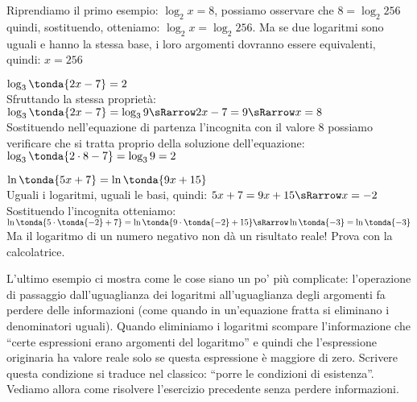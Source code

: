 \begin{esempio}
 Riprendiamo il primo esempio: \(\log_2{x} = 8\), possiamo osservare che 
 \(8 = \log_2{256}\) quindi, sostituendo, 
 otteniamo: \(\log_2{x} = \log_2{256}\). Ma se due logaritmi sono uguali e 
hanno la stessa base, i loro argomenti dovranno essere equivalenti, quindi:
\(x = 256\)
\end{esempio}

\begin{esempio}
 \(\log_{3}\tonda{2x-7} = 2 \)\\[4pt]
 Sfruttando la stessa proprietà: 
 \(\log_{3}\tonda{2x-7} = \log_{3}9 \sRarrow  
2x -7 = 9 \sRarrow x = 8\)
\\[4pt] 
Sostituendo nell'equazione di partenza l'incognita con il valore 8 
possiamo verificare che si tratta proprio della soluzione dell'equazione:
\(\log_{3}\tonda{2 \cdot 8-7} = \log_{3} 9 = 2\)
\end{esempio}

\begin{esempio}
 \(\ln\tonda{5x +7} = \ln\tonda{9x +15}\)
 \\[4pt]
 Uguali i logaritmi, uguali le basi, quindi:
 \(5x +7 = 9x +15  \sRarrow x = -2\)
 \\[4pt]
Sostituendo l'incognita otteniamo:
 \(\ln\tonda{5 \cdot \tonda{-2} +7} = 
   \ln\tonda{9 \cdot \tonda{-2} +15} \sRarrow 
   \ln\tonda{-3} = \ln\tonda{-3}\)
   \\[4pt]
 Ma il logaritmo di un numero negativo non dà un risultato reale! Prova con la calcolatrice.
\end{esempio}

L'ultimo esempio ci mostra come le cose siano un po' più complicate: 
l'operazione di passaggio dall'uguaglianza dei logaritmi all'uguaglianza degli 
argomenti fa perdere delle informazioni (come quando in un'equazione fratta si 
eliminano i denominatori uguali). 
Quando eliminiamo i logaritmi scompare l'informazione che ``certe espressioni 
erano argomenti del logaritmo'' e quindi che l'espressione originaria ha valore 
reale solo se questa espressione è maggiore di zero. 
Scrivere questa condizione si traduce nel classico: ``porre le condizioni di esistenza''.
Vediamo allora come risolvere l'esercizio precedente senza perdere informazioni.

